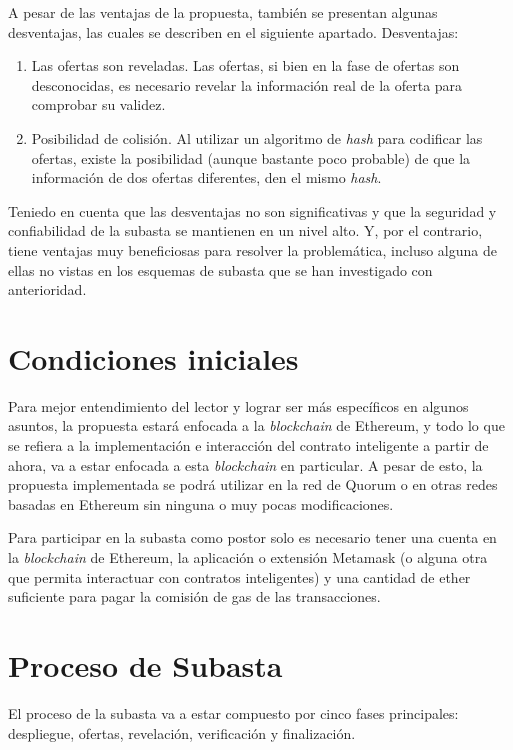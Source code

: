   A pesar de las ventajas de la propuesta, también se presentan algunas desventajas, las cuales se 
  describen en el siguiente apartado. Desventajas:

  \begin{enumerate}
    \item Las ofertas son reveladas. Las ofertas, si bien en la fase de ofertas son desconocidas, es necesario revelar la información
    real de la oferta para comprobar su validez.
    \item Posibilidad de colisión. Al utilizar un algoritmo de \textit{hash} para codificar las ofertas, existe la posibilidad (aunque bastante
    poco probable) de que la información de dos ofertas diferentes, den el mismo \textit{hash}. 
  \end{enumerate}

  Teniedo en cuenta que las desventajas no son significativas y que la seguridad y confiabilidad de la 
  subasta se mantienen en un nivel alto. Y, por el contrario, tiene
  ventajas muy beneficiosas para resolver la problemática, incluso alguna de ellas no vistas en los esquemas de subasta que se han 
  investigado con anterioridad.

\section{Condiciones iniciales}
  Para mejor entendimiento del lector y lograr ser más específicos en algunos asuntos, la propuesta estará enfocada a la \textit{blockchain} de
  Ethereum, y todo lo que se refiera a la implementación e interacción del contrato inteligente a partir de ahora, va a estar enfocada
  a esta \textit{blockchain} en particular. A pesar de esto, la propuesta implementada se podrá utilizar en la red de Quorum o en otras redes basadas
  en Ethereum sin ninguna o muy pocas modificaciones.

  Para participar en la subasta como postor solo es necesario tener una cuenta en la \textit{blockchain} de Ethereum, la aplicación o extensión
  Metamask (o alguna otra que permita interactuar con contratos inteligentes) y una cantidad de ether suficiente para pagar la comisión
  de gas de las transacciones.

\section{Proceso de Subasta}
  El proceso de la subasta va a estar compuesto por cinco fases principales: despliegue, ofertas, revelación,
  verificación y finalización.

